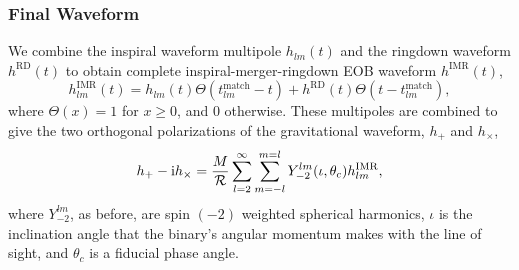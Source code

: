\documentclass[aps,
prd,
amsmath,
amssymb,
twocolumn,
floatfix,
groupedaddress]{revtex4-1}
\newcommand{\Sum}{\displaystyle\sum\limits}
\newcommand{\ii}{{\rm i}}
\newcommand{\RD}{\mathrm{RD}}
\begin{document}
\subsubsection{Final Waveform}\label{sec:level3:FinalWaveform}
We combine the inspiral waveform multipole $h_{lm}(t)$ and the ringdown waveform $h^{\RD}(t)$ to obtain complete inspiral-merger-ringdown EOB waveform $h^{\textrm{IMR}}(t)$,
\begin{equation}
h^{\textrm{IMR}}_{lm}(t) = h_{lm}(t)\Theta(t^{\mathrm{match}}_{lm}-t) + h^{\RD}(t)\Theta(t-t^{\mathrm{match}}_{lm}),
\end{equation}
where $\Theta(x)=1$ for $x\geq 0$, and 0 otherwise. These multipoles are combined to give the two orthogonal polarizations of the gravitational waveform, $h_+$ and $h_{\times}$, 
\begin{equation}
h_+ - \ii h_{\times} = \dfrac{M}{\mathcal{R}} \Sum^{\infty}_{l=2} \Sum^{m=l}_{m = -l} Y^{lm}_{-2}(\iota,\theta_c) h^{\mathrm{IMR}}_{lm},
\end{equation}
where $Y^{lm}_{-2}$, as before, are spin $(-2)$ weighted spherical harmonics, $\iota$ is the inclination angle that the binary's angular momentum makes with the line of sight, and $\theta_c$ is a fiducial phase angle.
\end{document}
